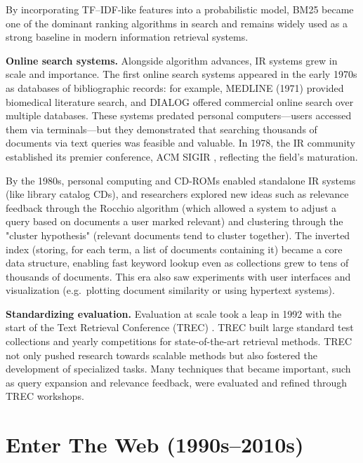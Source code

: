 By incorporating TF--IDF-like features into a probabilistic model, BM25  became one of the dominant ranking algorithms in search and remains widely used as a strong baseline in modern information retrieval systems.

\noindent\textbf{Online search systems.}
Alongside algorithm advances, IR systems grew in scale and importance. The first online search systems appeared in the early 1970s as databases of bibliographic records: for example, MEDLINE  (1971) provided biomedical literature search, and DIALOG  offered commercial online search over multiple databases. These systems predated personal computers---users accessed them via terminals---but they demonstrated that searching thousands of documents via text queries was feasible and valuable. In 1978, the IR community established its premier conference, ACM SIGIR , reflecting the field's maturation.

By the 1980s, personal computing and CD-ROMs enabled standalone IR systems (like library catalog CDs), and researchers explored new ideas such as relevance feedback through the Rocchio algorithm  (which allowed a system to adjust a query based on documents a user marked relevant) and clustering through the "cluster hypothesis"  (relevant documents tend to cluster together). The inverted index  (storing, for each term, a list of documents containing it) became a core data structure, enabling fast keyword lookup even as collections grew to tens of thousands of documents. This era also saw experiments with user interfaces and visualization (e.g.\ plotting document similarity or using hypertext systems).

\noindent\textbf{Standardizing evaluation.}
Evaluation at scale took a leap in 1992 with the start of the Text Retrieval Conference (TREC) . TREC built large standard test collections and yearly competitions for state-of-the-art retrieval methods. TREC not only pushed research towards scalable methods but also fostered the development of specialized tasks. Many techniques that became important, such as query expansion and relevance feedback, were evaluated and refined through TREC workshops.

\section{Enter The Web (1990s--2010s)}

